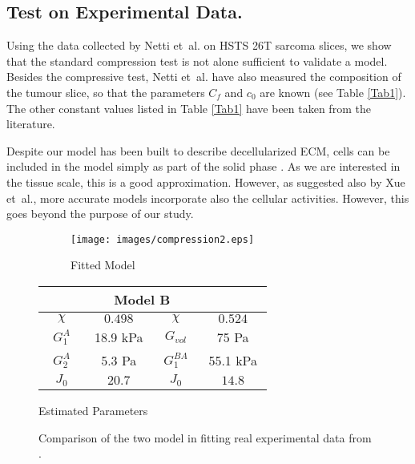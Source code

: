 \subsection{Test on Experimental Data.}
\label{data}
Using the data collected by Netti et~al. \cite{Netti} on HSTS 26T sarcoma slices, we show that the standard compression test is not alone sufficient to validate a model. Besides the compressive test, Netti et~al. have also measured the composition of the tumour slice, so that the parameters $C_f$ and $c_0$ are known (see Table \ref{Tab1}). The other constant values listed in Table \ref{Tab1} have been taken from the literature. 

Despite our model has been built to describe decellularized ECM, cells can be included in the model simply as part of the solid phase \cite{ecm2}. As we are interested in the tissue scale, this is a good approximation. However, as suggested also by Xue et~al.\cite{ecm2}, more accurate models incorporate also the cellular activities. However, this goes beyond the purpose of our study. 

\begin{figure}[h]
	\hspace{-8mm}
	\begin{subfigure}{0.62\textwidth}
		\hspace{2mm}
		\texttt{[image: images/compression2.eps]}
		\caption{Fitted Model}
		\label{fit}
	\end{subfigure}
	\begin{subtable}{0.375\textwidth}
			\begin{tabular}{c | c ||c| c }		
				\hline\addlinespace[2pt]
				 \multicolumn{2}{c||}{Model A} &  \multicolumn{2}{c}{Model B}\\[0.5mm]
				\hline\addlinespace[2pt]
				$\quad \chi\quad$ & $\quad0.498\quad$ &$\quad \chi\quad$&$\quad0.524\quad$\\[0.5mm]
				$G^A_1$ & 18.9 kPa&$G_{vol}$&75 Pa\\[0.5mm]
				$G^A_2$ & 5.3 Pa&$G^{BA}_{1}$& 55.1 kPa\\[0.5mm]
				$J_0$ & $20.7$&  $J_0$&$14.8$\\[0.5mm]
				\hline
			\end{tabular}
		\caption{Estimated Parameters}
		\label{param}
	\end{subtable}
\caption{Comparison of the two model in fitting real experimental data from \cite{Netti}.}		
\end{figure}

